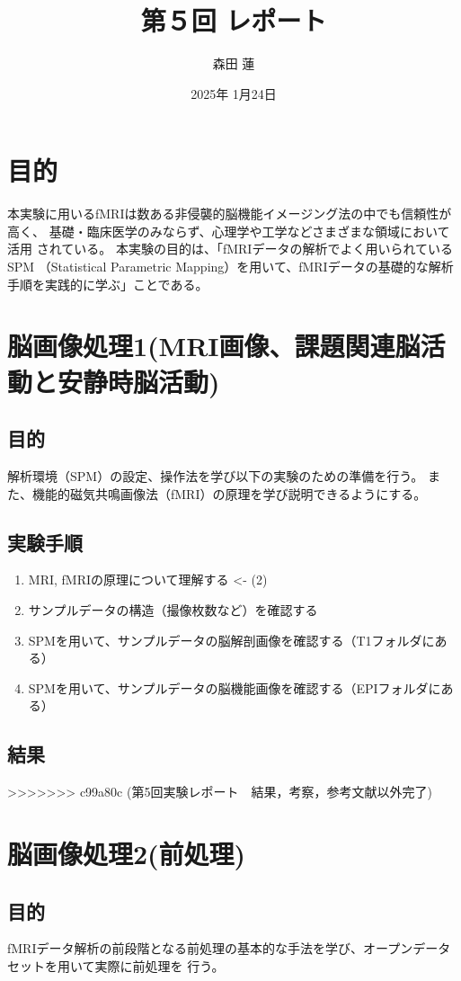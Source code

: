 \documentclass{jlreq}
\title{第５回 レポート}
\author{森田 蓮}
\date{2025年 1月24日}
\begin{document}
\maketitle

\section{目的}
本実験に用いるfMRIは数ある非侵襲的脳機能イメージング法の中でも信頼性が高く、
基礎・臨床医学のみならず、心理学や工学などさまざまな領域において活用
されている。
本実験の目的は、「fMRIデータの解析でよく用いられているSPM
（Statistical Parametric Mapping）を用いて、fMRIデータの基礎的な解析
手順を実践的に学ぶ」ことである。

\section{脳画像処理1(MRI画像、課題関連脳活動と安静時脳活動)}
\subsection{目的}
解析環境（SPM）の設定、操作法を学び以下の実験のための準備を行う。
また、機能的磁気共鳴画像法（fMRI）の原理を学び説明できるようにする。

\subsection{実験手順}
\begin{enumerate}
    \item MRI, fMRIの原理について理解する <- (2)
    \item サンプルデータの構造（撮像枚数など）を確認する
    \item SPMを用いて、サンプルデータの脳解剖画像を確認する（T1フォルダにある）
    \item SPMを用いて、サンプルデータの脳機能画像を確認する（EPIフォルダにある）
\end{enumerate}
\subsection{結果}

>>>>>>> c99a80c (第5回実験レポート　結果，考察，参考文献以外完了)
\section{脳画像処理2(前処理)}
\subsection{目的}
fMRIデータ解析の前段階となる前処理の基本的な手法を学び、オープンデータセットを用いて実際に前処理を
行う。
\end{document}
